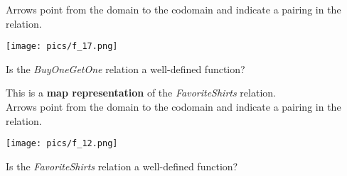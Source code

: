 \documentclass{ximera}
\begin{document}
\begin{exercise}
\begin{question}
Arrows point from the domain to the codomain and indicate a pairing in the relation.

\begin{image}
\texttt{[image: pics/f\_17.png]}
\end{image}

Is the \textit{BuyOneGetOne} relation a well-defined function?

\begin{multipleChoice}
\end{multipleChoice}

\end{question}











\begin{question}

This is a \textbf{map representation} of the \textit{FavoriteShirts} relation. \\

Arrows point from the domain to the codomain and indicate a pairing in the relation.

\begin{image}
\texttt{[image: pics/f\_12.png]}
\end{image}

Is the \textit{FavoriteShirts} relation a well-defined function?

\begin{multipleChoice}
\end{multipleChoice}

\end{question}














\end{exercise}
\end{document}
